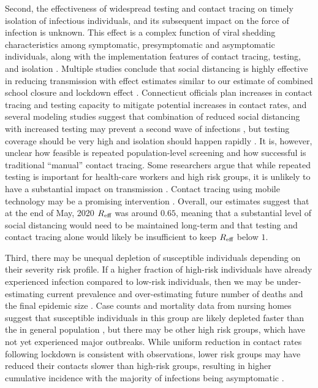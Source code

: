\documentclass[11pt]{article}
\begin{document}
Second, the effectiveness of widespread testing and contact tracing on timely isolation of infectious individuals, and its subsequent impact on the force of infection is unknown. This effect is a complex function of viral shedding characteristics among symptomatic, presymptomatic and asymptomatic individuals, along with the implementation features of contact tracing, testing, and isolation \citep{kaplan2020logistics}. 
Multiple studies conclude that social distancing is highly effective in reducing transmission with effect estimates similar to our estimate of combined school closure and lockdown effect \citep{salje2020estimating, perez2020importance, dehning2020inferring, brett2020covid,  prem2020effect}. 
Connecticut officials plan increases in contact tracing and testing capacity to mitigate potential increases in contact rates, and several modeling studies suggest that combination of reduced social distancing with increased testing may prevent a second wave of infections \citep{aleta2020modeling, childs2020impact}, but testing coverage should be very high and isolation should happen rapidly \citep{perez2020importance}. It is, however, unclear how feasible is repeated population-level screening and how successful is traditional ``manual'' contact tracing. Some researchers argue that while repeated testing is important for health-care workers and high risk groups, it is unlikely to have a substantial impact on transmission \citep{grassly2020role}. 
Contact tracing using mobile technology may be a promising intervention \citep{ferretti2020quantifying}. Overall, our estimates suggest that at the end of May, 2020 $R\textsubscript{eff}$ was around $0.65$, meaning that a substantial level of social distancing would need to be maintained long-term and that testing and contact tracing alone would likely be insufficient to keep $R\textsubscript{eff}$ below $1$.

Third, there may be unequal depletion of susceptible individuals depending on their severity risk profile. If a higher fraction of high-risk individuals have already experienced infection compared to low-risk individuals, then we may be under-estimating current prevalence and over-estimating future number of deaths and the final epidemic size \citep{gomes2020individual, britton2020disease}. Case counts and mortality data from nursing homes suggest that susceptible individuals in this group are likely depleted faster than the in general population \citep{DPHwebsitenursing}, but there may be other high risk groups, which have not yet experienced major outbreaks. While uniform reduction in contact rates following lockdown is consistent with observations, lower risk groups may have reduced their contacts slower than high-risk groups, resulting in higher cumulative incidence with the majority of infections being asymptomatic \citep{campbell2020prevalence}.
\end{document}
